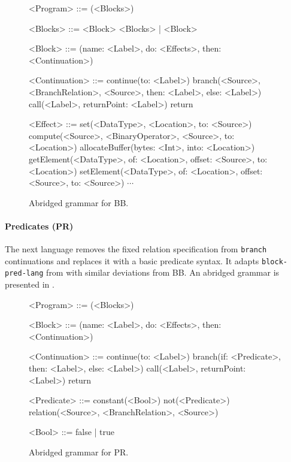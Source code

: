 \documentclass[main.tex]{subfiles}
\begin{document}
\begin{figure}[ht]
	\small
	\begin{grammar}
		
		<Program> ::= (<Blocks>)
		
		<Blocks> ::= <Block> <Blocks> | <Block>
		
		<Block> ::= (name: <Label>, do: <Effects>, then: <Continuation>)
		
		<Continuation> ::= continue(to: <Label>)
			\alt branch(<Source>, <BranchRelation>, <Source>, then: <Label>, else: <Label>)
			\alt call(<Label>, returnPoint: <Label>)
			\alt return
		
		<Effect> ::= set(<DataType>, <Location>, to: <Source>)
			\alt compute(<Source>, <BinaryOperator>, <Source>, to: <Location>)
			\alt allocateBuffer(bytes: <Int>, into: <Location>)
			\alt getElement(<DataType>, of: <Location>, offset: <Source>, to: <Location>)
			\alt setElement(<DataType>, of: <Location>, offset: <Source>, to: <Source>)
			\alt $\cdots$
		
	\end{grammar}
	\caption{Abridged grammar for BB.}
	\label{bnf:bb}
\end{figure}

\paragraph{Predicates (PR)} The next language removes the fixed relation specification from \texttt{branch} continuations and replaces it with a basic predicate syntax. It adapts \texttt{block-pred-lang} from \cite{compcourse} with similar deviations from BB. An abridged grammar is presented in .

\begin{figure}[ht]
	\small
	\begin{grammar}
		
		<Program> ::= (<Blocks>)
		
		<Block> ::= (name: <Label>, do: <Effects>, then: <Continuation>)
		
		<Continuation> ::= continue(to: <Label>)
			\alt branch(if: <Predicate>, then: <Label>, else: <Label>)
			\alt call(<Label>, returnPoint: <Label>)
			\alt return
			
		<Predicate> ::= constant(<Bool>)
			\alt not(<Predicate>)
			\alt relation(<Source>, <BranchRelation>, <Source>)
			
		<Bool> ::= false | true
		
	\end{grammar}
	\caption{Abridged grammar for PR.}
	\label{bnf:pr}
\end{figure}
\end{document}
